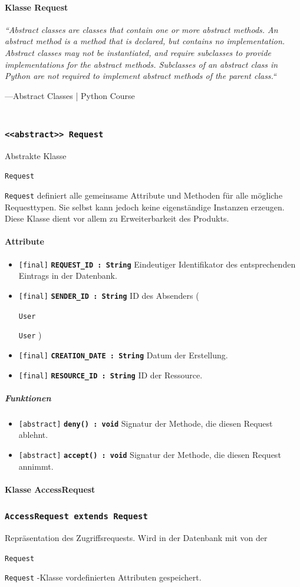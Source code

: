 \documentclass[parskip=full,11pt]{scrartcl}
\makeatletter
\newcommand{\lstInline}[2][,]{%
	\begingroup%
	\lstset{#1}%
	\begin{lrbox}{\mylisting}\lstinline!#2!\end{lrbox}%
	\setlength{\@tempdima}{\linegoal}%
	\ifdim\wd\mylisting>\@tempdima\hfill\\\fi%
	\lstinline!#2!%
	\endgroup%
}
\newcommand{\class}[1]{\subsubsection*{\lstinline[basicstyle=\ttfamily\large]{#1}}}
\newcommand{\atr}[4]{\lstinline{[#3]} \textbf{\lstinline{#1 : #2}} \newline #4}
\newcommand{\mtd}[5]{\lstinline{[#4]} \textbf{\lstinline{#1(#3) : #2}} \newline #5}
\newcommand{\inlinecode}[1]{\lstInline[breaklines=true]{#1}}
\makeatother
\begin{document}
  \paragraph*{Klasse Request}
  
      \begin{center}
    \textit{``Abstract classes are classes that contain one or more abstract methods. An abstract method is a method that is declared, but contains no implementation. Abstract classes may not be instantiated, and require subclasses to provide implementations for the abstract methods. Subclasses of an abstract class in Python are not required to implement abstract methods of the parent class.``}
    \end{center}
    —Abstract Classes | Python Course\\\\
    
 \class{<<abstract>> Request}
Abstrakte Klasse \inlinecode{Request} definiert alle gemeinsame Attribute und Methoden für alle mögliche Requesttypen. Sie selbst kann jedoch keine eigenständige Instanzen erzeugen. Diese Klasse dient vor allem zu Erweiterbarkeit des Produkts. 
 
\paragraph*{Attribute} %
\begin{itemize}
	\item \atr{REQUEST_ID}{String}{final}{
	Eindeutiger Identifikator des entsprechenden Eintrags in der Datenbank. 
	}
		\item \atr{SENDER_ID}{String}{final}{
	ID des Absenders (\inlinecode{User}) 
	}
		\item \atr{CREATION_DATE}{String}{final}{
	Datum der Erstellung. 
	}
		\item \atr{RESOURCE_ID}{String}{final}{
	ID der Ressource. 
	}
\end{itemize}
\subparagraph*{Funktionen}  %
\begin{itemize}
	\item \mtd{deny}{void}{}{abstract}{
	Signatur der Methode, die diesen Request ablehnt.
	}
	
	\item \mtd{accept}{void}{}{abstract}{
Signatur der Methode, die diesen Request annimmt.
	}
\end{itemize}
\newpage
  \paragraph*{Klasse AccessRequest}
 \class{AccessRequest extends Request}
Repräsentation des Zugriffsrequests. Wird in der Datenbank mit von der \inlinecode{Request}-Klasse vordefinierten Attributen gespeichert. 
 
\end{document}
